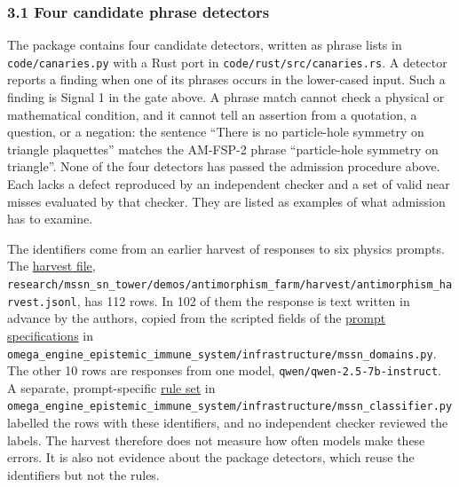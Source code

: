\documentclass[
  11pt,
]{article}
\begin{document}
\hypertarget{four-candidate-phrase-detectors}{%
\subsubsection{3.1 Four candidate phrase
detectors}\label{four-candidate-phrase-detectors}}

The package contains four candidate detectors, written as phrase lists
in \texttt{\nolinkurl{code/canaries.py}} with a Rust port in
\texttt{\nolinkurl{code/rust/src/canaries.rs}}. A detector reports
a finding when one of its phrases occurs in the lower-cased input. Such
a finding is Signal 1 in the gate above. A phrase match cannot check a
physical or mathematical condition, and it cannot tell an assertion from
a quotation, a question, or a negation: the sentence ``There is no
particle-hole symmetry on triangle plaquettes'' matches the AM-FSP-2
phrase ``particle-hole symmetry on triangle''. None of the four
detectors has passed the admission procedure above. Each lacks a defect
reproduced by an independent checker and a set of valid near misses
evaluated by that checker. They are listed as examples of what admission
has to examine.

The identifiers come from an earlier harvest of responses to six physics
prompts. The
\href{https://github.com/dbccpage/the_symbol_game/blob/52cb5457f6c485ba548cfd292f6012a941ed22cf/research/mssn_sn_tower/demos/antimorphism_farm/harvest/antimorphism_harvest.jsonl}{harvest
file},
\texttt{\nolinkurl{research/mssn_sn_tower/demos/antimorphism_farm/harvest/antimorphism_harvest.jsonl}},
has 112 rows. In 102 of them the response is text written in advance by
the authors, copied from the scripted fields of the
\href{https://github.com/dbccpage/the_symbol_game/blob/52cb5457f6c485ba548cfd292f6012a941ed22cf/omega_engine_epistemic_immune_system/infrastructure/mssn_domains.py}{prompt
specifications} in
\texttt{\nolinkurl{omega_engine_epistemic_immune_system/infrastructure/mssn_domains.py}}.
The other 10 rows are responses from one model,
\texttt{\nolinkurl{qwen/qwen-2.5-7b-instruct}}. A separate,
prompt-specific
\href{https://github.com/dbccpage/the_symbol_game/blob/52cb5457f6c485ba548cfd292f6012a941ed22cf/omega_engine_epistemic_immune_system/infrastructure/mssn_classifier.py}{rule
set} in
\texttt{\nolinkurl{omega_engine_epistemic_immune_system/infrastructure/mssn_classifier.py}}
labelled the rows with these identifiers, and no independent checker
reviewed the labels. The harvest therefore does not measure how often
models make these errors. It is also not evidence about the package
detectors, which reuse the identifiers but not the rules.
\end{document}
